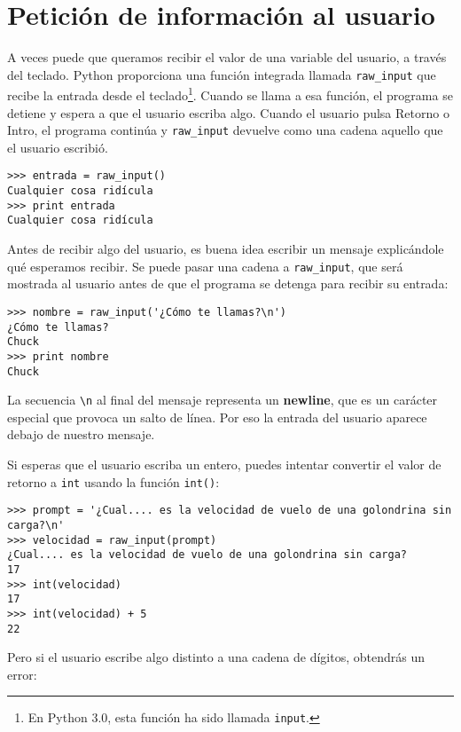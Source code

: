 \section{Petición de información al usuario}

A veces puede que queramos recibir el valor de una variable del usuario,
a través del teclado.
Python proporciona una función integrada llamada \verb"raw_input" que recibe
la entrada desde el teclado\footnote{En Python 3.0, esta función ha sido llamada
{\tt input}.}. Cuando se llama a esa función, el programa se detiene y
espera a que el usuario escriba algo. Cuando el usuario pulsa {\sf Retorno} o
{\sf Intro}, el programa continúa y \verb"raw_input"
devuelve como una cadena aquello que el usuario escribió.


\beforeverb
\begin{verbatim}
>>> entrada = raw_input()
Cualquier cosa ridícula
>>> print entrada
Cualquier cosa ridícula
\end{verbatim}
\afterverb
%
Antes de recibir algo del usuario, es buena idea escribir
un mensaje explicándole qué esperamos recibir. Se puede pasar una cadena a
\verb"raw_input", que será mostrada al usuario antes de que el programa se detenga
para recibir su entrada:


\beforeverb
\begin{verbatim}
>>> nombre = raw_input('¿Cómo te llamas?\n')
¿Cómo te llamas?
Chuck
>>> print nombre
Chuck
\end{verbatim}
\afterverb
%
La secuencia \verb"\n" al final del mensaje representa un {\bf newline},
que es un carácter especial que provoca un salto de línea.
Por eso la entrada del usuario aparece debajo de nuestro mensaje.


Si esperas que el usuario escriba un entero, puedes intentar convertir
el valor de retorno a {\tt int} usando la función {\tt int()}:

\beforeverb
\begin{verbatim}
>>> prompt = '¿Cual.... es la velocidad de vuelo de una golondrina sin carga?\n'
>>> velocidad = raw_input(prompt)
¿Cual.... es la velocidad de vuelo de una golondrina sin carga?
17
>>> int(velocidad)
17
>>> int(velocidad) + 5
22
\end{verbatim}
\afterverb
%
Pero si el usuario escribe algo distinto a una cadena de dígitos,
obtendrás un error:

